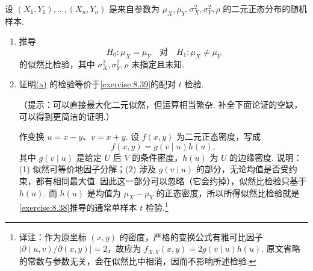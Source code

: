\begin{exercise}\label{exercise:8.40}
设 $(X_1,Y_1),\ldots,(X_n,Y_n)$ 是来自参数为 $\mu_X,\mu_Y,\sigma_X^2,\sigma_Y^2,\rho$ 的二元正态分布的随机样本.
\begin{enumerate}
\item{}\label{itm:exercise:8.40:a} 推导
$$H_0:\mu_X=\mu_Y\quad\text{对}\quad H_1:\mu_X\ne\mu_Y$$
的似然比检验，其中 $\sigma_X^2,\sigma_Y^2,\rho$ 未指定且未知.
\item 证明\hyperref[itm:exercise:8.40:a]{(a)} 的检验等价于\autoref{exercise:8.39}的配对 $t$ 检验.

（提示：可以直接最大化二元似然，但运算相当繁杂. 补全下面论证的空缺，可以得到更简洁的证明.）

作变换 $u=x-y$、$v=x+y$. 设 $f(x,y)$ 为二元正态密度，写成
$$f(x,y)=g(v\mid u)h(u),$$
其中 $g(v\mid u)$ 是给定 $U$ 后 $V$ 的条件密度，$h(u)$ 为 $U$ 的边缘密度. 说明：(1) 似然可等价地因子分解；(2) 涉及 $g(v\mid u)$ 的部分，无论均值是否受约束，都有相同最大值. 因此这一部分可以忽略（它会约掉），似然比检验只基于 $h(u)$. 而 $h(u)$ 是均值为 $\mu_X-\mu_Y$ 的正态密度，所以所得似然比检验就是\autoref{exercise:8.38}推导的通常单样本 $t$ 检验.\footnote{译注：作为原坐标 $(x,y)$ 的密度，严格的变换公式有雅可比因子 $|\partial(u,v)/\partial(x,y)|=2$，故应为 $f_{X,Y}(x,y)=2g(v\mid u)h(u)$. 原文省略的常数与参数无关，会在似然比中相消，因而不影响所述检验.}
\end{enumerate}
\end{exercise}
